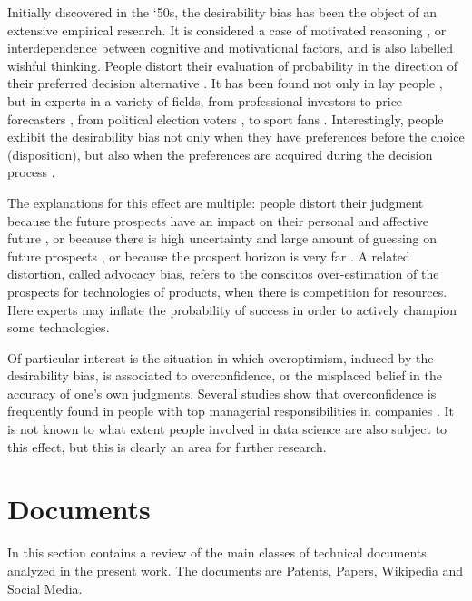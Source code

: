 \documentclass[]{book}
\begin{document}
Initially discovered in the `50s, the desirability bias has been the
object of an extensive empirical research. It is considered a case of
motivated reasoning \citep{kunda1990case}, or interdependence between
cognitive and motivational factors, and is also labelled wishful
thinking. People distort their evaluation of probability in the
direction of their preferred decision alternative
\citep{dekay2009distortion}. It has been found not only in lay people
\citep{lench2012automatic}, but in experts in a variety of fields, from
professional investors to price forecasters , from political election
voters , to sport fans . Interestingly, people exhibit the desirability
bias not only when they have preferences before the choice
(disposition), but also when the preferences are acquired during the
decision process \citep{russo1996distortion}.

The explanations for this effect are multiple: people distort their
judgment because the future prospects have an impact on their personal
and affective future
\citep{ayton1989psychological, wright1996role, lench2008automatic}, or
because there is high uncertainty and large amount of guessing on future
prospects \citep{windschitl2010desirability}, or because the prospect
horizon is very far \citep{vosgerau2010prevalent}. A related distortion,
called advocacy bias, refers to the consciuos over-estimation of the
prospects for technologies of products, when there is competition for
resources. Here experts may inflate the probability of success in order
to actively champion some technologies.

Of particular interest is the situation in which overoptimism, induced
by the desirability bias, is associated to overconfidence, or the
misplaced belief in the accuracy of one's own judgments. Several studies
show that overconfidence is frequently found in people with top
managerial responsibilities in companies \citep{hribar2016ceo}. It is
not known to what extent people involved in data science are also
subject to this effect, but this is clearly an area for further
research.

\chapter{Documents}\label{sotadocuments}

In this section contains a review of the main classes of technical
documents analyzed in the present work. The documents are Patents,
Papers, Wikipedia and Social Media.
\end{document}
